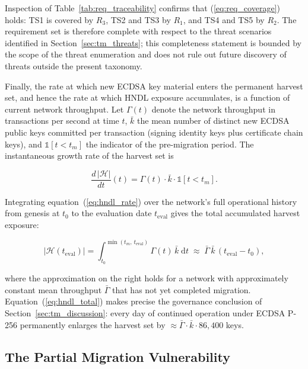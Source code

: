 \documentclass[conference]{IEEEtran}
\begin{document}
Inspection of Table~\ref{tab:req_traceability} confirms that
(\ref{eq:req_coverage}) holds: TS1 is covered by $R_3$, TS2 and TS3
by $R_1$, and TS4 and TS5 by $R_2$. The requirement set is therefore
complete with respect to the threat scenarios identified in
Section~\ref{sec:tm_threats}; this completeness statement is bounded
by the scope of the threat enumeration and does not rule out future
discovery of threats outside the present taxonomy.

Finally, the rate at which new ECDSA key material enters the permanent
harvest set, and hence the rate at which HNDL exposure accumulates,
is a function of current network throughput. Let $\Gamma(t)$ denote
the network throughput in transactions per second at time $t$,
$\bar{k}$ the mean number of distinct new ECDSA public keys committed
per transaction (signing identity keys plus certificate chain keys),
and $\mathbb{1}[t < t_m]$ the indicator of the pre-migration period.
The instantaneous growth rate of the harvest set is

\begin{equation}
\frac{d\,|\mathcal{H}|}{dt}(t)
= \Gamma(t)\cdot\bar{k}\cdot\mathbb{1}[t < t_m].
\label{eq:hndl_rate}
\end{equation}

Integrating equation~(\ref{eq:hndl_rate}) over the network's full
operational history from genesis at $t_0$ to the evaluation date
$t_{\mathrm{eval}}$ gives the total accumulated harvest exposure:

\begin{equation}
|\mathcal{H}(t_{\mathrm{eval}})| =
\int_{t_0}^{\min(t_m,\,t_{\mathrm{eval}})}
\Gamma(t)\,\bar{k}\;\mathrm{d}t
\;\approx\; \bar{\Gamma}\,\bar{k}\,
(t_{\mathrm{eval}} - t_0),
\label{eq:hndl_total}
\end{equation}

where the approximation on the right holds for a network with
approximately constant mean throughput $\bar{\Gamma}$ that has not
yet completed migration. Equation~(\ref{eq:hndl_total}) makes precise
the governance conclusion of Section~\ref{sec:tm_discussion}: every
day of continued operation under ECDSA P-256 permanently enlarges the
harvest set by $\approx \bar{\Gamma}\cdot\bar{k}\cdot 86{,}400$ keys.

\subsection{The Partial Migration Vulnerability}
\label{sec:tm_partial}
\end{document}
